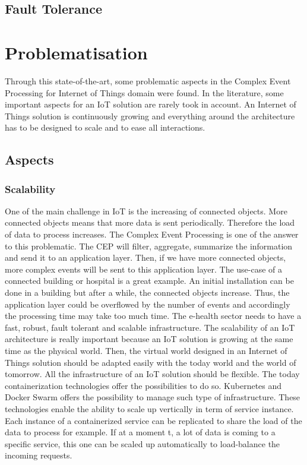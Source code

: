 \documentclass[11pt]{article}
\begin{document}
\subsection{Fault Tolerance}

\section{Problematisation} \label{problematic}

Through this state-of-the-art, some problematic aspects in the Complex Event Processing for Internet of Things domain were found. In the literature, some important aspects for an IoT solution are rarely took in account. An Internet of Things solution is continuously growing and everything around the architecture has to be designed to scale and to ease all interactions. 

\subsection{Aspects}

\subsubsection{Scalability}

One of the main challenge in IoT is the increasing of connected objects. More connected objects means that more data is sent periodically. Therefore the load of data to process increases. The Complex Event Processing is one of the answer to this problematic. The CEP will filter, aggregate, summarize the information and send it to an application layer. Then, if we have more connected objects, more complex events will be sent to this application layer. The use-case of a connected building or hospital is a great example. An initial installation can be done in a building but after a while, the connected objects increase. Thus, the application layer could be overflowed by the number of events and accordingly the processing time may take too much time. The e-health sector needs to have a fast, robust, fault tolerant and scalable infrastructure. The scalability of an IoT architecture is really important because an IoT solution is growing at the same time as the physical world. Then, the virtual world designed in an Internet of Things solution should be adapted easily with the today world and the world of tomorrow. 
\newline
\newline
All the infrastructure of an IoT solution should be flexible. The today containerization technologies offer the possibilities to do so. Kubernetes and Docker Swarm offers the possibility to manage such type of infrastructure. These technologies enable the ability to scale up vertically in term of service instance. Each instance of a containerized service can be replicated to share the load of the data to process for example. If at a moment t, a lot of data is coming to a specific service, this one can be scaled up automatically to load-balance the incoming requests. 
\end{document}
